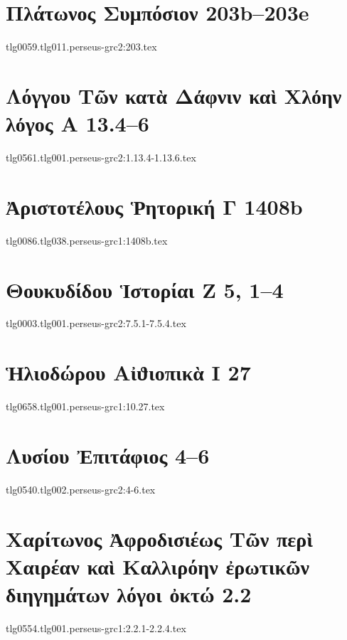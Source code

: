 \documentclass[a4paper,12pt,twoside]{report}
\begin{document}
\chapter[Πλάτωνος Συμπόσιον]{\textgreek[variant=ancient]{Πλάτωνος Συμπόσιον} 203b–203e}
{tlg0059.tlg011.perseus-grc2:203.tex}

\chapter[Λόγγου Τῶν κατὰ Δάφνιν καὶ Χλόην]{\textgreek[variant=ancient]{Λόγγου Τῶν κατὰ Δάφνιν καὶ Χλόην \\λόγος Α} 13.4–6}
{tlg0561.tlg001.perseus-grc2:1.13.4-1.13.6.tex}

\chapter[Ἀριστοτέλους Ῥητορική Γ]{\textgreek[variant=ancient]{Ἀριστοτέλους Ῥητορική Γ} 1408b}
{tlg0086.tlg038.perseus-grc1:1408b.tex}

\chapter[Θουκυδίδου Ἱστορίαι Ζ]{\textgreek[variant=ancient]{Θουκυδίδου Ἱστορίαι Ζ} 5, 1–4}
{tlg0003.tlg001.perseus-grc2:7.5.1-7.5.4.tex}

\chapter[Ἡλιοδώρου Αἰϑιοπικὰ Ι]{\textgreek[variant=ancient]{Ἡλιοδώρου Αἰϑιοπικὰ Ι} 27}
{tlg0658.tlg001.perseus-grc1:10.27.tex}

\chapter[Λυσίου Ἐπιτάφιος]{\textgreek[variant=ancient]{Λυσίου Ἐπιτάφιος} 4–6}
{tlg0540.tlg002.perseus-grc2:4-6.tex}

\chapter[Χαρίτωνος Τὰ περὶ Χαιρέαν καὶ Καλλιρόην]{\textgreek[variant=ancient]{Χαρίτωνος Ἀφροδισιέως Τῶν περὶ Χαιρέαν καὶ Καλλιρόην ἐρωτικῶν διηγημάτων λόγοι ὀκτώ} 2.2}
{tlg0554.tlg001.perseus-grc1:2.2.1-2.2.4.tex}
\end{document}
